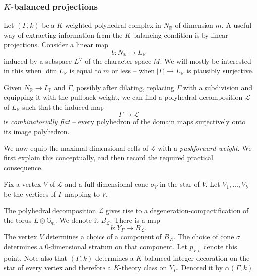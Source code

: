 \documentclass[11pt]{amsart}
\theoremstyle{definition}
\theoremstyle{definition}
\newtheorem{example}[theorem]{Example}
\newcommand{\RR}{\mathbb{R}}
\begin{document}

\subsubsection{$K$-balanced projections}\label{sec: K-projections} Let $(\Gamma,k)$ be a $K$-weighted polyhedral complex in $N_\RR$ of dimension $m$. A useful way of extracting information from the $K$-balancing condition is by linear projections. Consider a linear map
\[
b\colon N_{\mathbb R}\to L_{\mathbb R}
\]
induced by a subspace $L^\vee$ of the character space $M$. We will mostly be interested in this when $\dim L_{\mathbb R}$ is equal to $m$ or less -- when $|\Gamma|\to L_{\mathbb R}$ is plausibly surjective. 

Given $N_{\mathbb R}\to L_{\mathbb R}$ and $\Gamma$, possibly after dilating, replacing $\Gamma$ with a subdivision and equipping it with the pullback weight, we can find a polyhedral decomposition $\mathcal L$ of $L_{\mathbb R}$ such that the induced map
\[
\Gamma\to\mathcal L
\]
is {\it combinatorially flat} -- every polyhedron of the domain maps surjectively onto its image polyhedron. 

We now equip the maximal dimensional cells of $\mathcal L$ with a {\it pushforward weight}. We first explain this conceptually, and then record the required practical consequence. 

Fix a vertex $V$ of $\mathcal L$ and a full-dimensional cone $\sigma_V$ in the star of $V$. Let $V_1,\ldots, V_b$ be the vertices of $\Gamma$ mapping to $V$. 

The polyhedral decomposition $\mathcal L$ gives rise to a degeneration-compactification of the torus $L\otimes\mathbb G_m$. We denote it $B_{\mathcal L}$. There is a map
\[
b\colon Y_\Gamma\to B_{\mathcal L}.
\]
The vertex $V$ determines a choice of a component of $B_{\mathcal L}$. The choice of cone $\sigma$ determines a $0$-dimensional stratum on that component. Let $p_{V,\sigma}$ denote this point. Note also that $(\Gamma,k)$ determines a $K$-balanced integer decoration on the star of every vertex and therefore a $K$-theory class on $Y_\Gamma$. Denoted it by $\alpha(\Gamma,k)$
\end{document}

